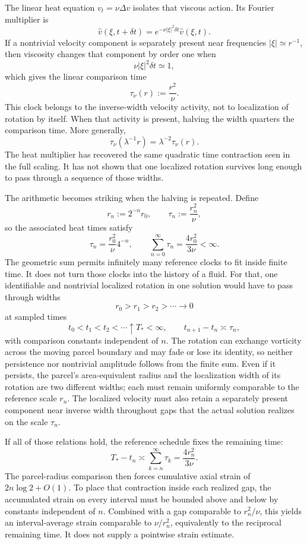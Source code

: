 
The linear heat equation \(v_t=\nu\Delta v\) isolates that viscous action. Its Fourier multiplier is
\[
  \widehat v(\xi,t+\delta t)
  =
  e^{-\nu|\xi|^2\delta t}\widehat v(\xi,t).
\]
If a nontrivial velocity component is separately present near frequencies \(|\xi|\simeq r^{-1}\), then viscosity changes that component by order one when
\[
  \nu|\xi|^2\delta t\simeq1,
\]
which gives the linear comparison time
\[
  \tau_\nu(r)
  :=
  \frac{r^2}{\nu}.
\]
This clock belongs to the inverse-width velocity activity, not to localization of rotation by itself. When that activity is present, halving the width quarters the comparison time. More generally,
\[
  \tau_\nu(\lambda^{-1}r)
  =
  \lambda^{-2}\tau_\nu(r).
\]
The heat multiplier has recovered the same quadratic time contraction seen in the full scaling. It has not shown that one localized rotation survives long enough to pass through a sequence of those widths.


The arithmetic becomes striking when the halving is repeated. Define
\[
  r_n:=2^{-n}r_0,
  \qquad
  \tau_n:=\frac{r_n^2}{\nu},
\]
so the associated heat times satisfy
\[
  \tau_n
  =
  \frac{r_0^2}{\nu}4^{-n},
  \qquad
  \sum_{n=0}^{\infty}\tau_n
  =
  \frac{4r_0^2}{3\nu}
  <
  \infty.
\]
The geometric sum permits infinitely many reference clocks to fit inside finite time. It does not turn those clocks into the history of a fluid. For that, one identifiable and nontrivial localized rotation in one \NavierStokes{} solution would have to pass through widths
\[
  r_0>r_1>r_2>\cdots\longrightarrow0
\]
at sampled times
\[
  t_0<t_1<t_2<\cdots\uparrow T_*<\infty,
  \qquad
  t_{n+1}-t_n\asymp\tau_n,
\]
with comparison constants independent of \(n\). The rotation can exchange vorticity across the moving parcel boundary and may fade or lose its identity, so neither persistence nor nontrivial amplitude follows from the finite sum. Even if it persists, the parcel's area-equivalent radius and the localization width of its rotation are two different widths; each must remain uniformly comparable to the reference scale \(r_n\). The localized velocity must also retain a separately present component near inverse width throughout gaps that the actual solution realizes on the scale \(\tau_n\).

If all of those relations hold, the reference schedule fixes the remaining time:
\[
  T_*-t_n
  \asymp
  \sum_{k=n}^{\infty}\tau_k
  =
  \frac{4r_n^2}{3\nu}.
\]
The parcel-radius comparison then forces cumulative axial strain of \(2n\log 2+O(1)\). To place that contraction inside each realized gap, the accumulated strain on every interval must be bounded above and below by constants independent of \(n\). Combined with a gap comparable to \(r_n^2/\nu\), this yields an interval-average strain comparable to \(\nu/r_n^2\), equivalently to the reciprocal remaining time. It does not supply a pointwise strain estimate.

